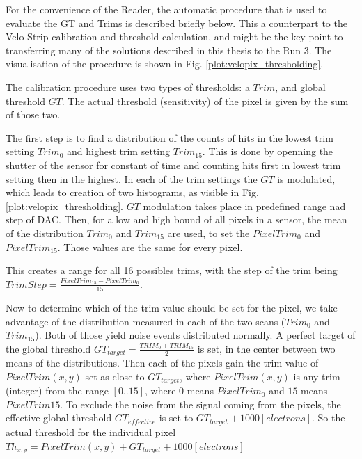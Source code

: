 For the convenience of the Reader, the automatic procedure that is used to evaluate the GT and Trims is described briefly below. This a counterpart to the Velo Strip calibration and threshold calculation, and might be the key point to transferring many of the solutions described in this thesis to the Run 3. The visualisation of the procedure is shown in Fig. \ref{plot:velopix_thresholding}.

The calibration procedure uses two types of thresholds: a $Trim$, and global threshold $GT$.
The actual threshold (sensitivity) of the pixel is given by the sum of those two.

The first step is to find a distribution of the counts of hits in the lowest trim setting  $Trim_{0}$ and highest trim setting $Trim_{15}$. This is done by openning the shutter of the sensor for constant of time and counting hits first in lowest trim setting then in the highest. In each of the trim settings the $GT$ is modulated, which leads to creation of two histograms, as visible in Fig. \ref{plot:velopix_thresholding}. $GT$ modulation takes place in predefined range nad step of DAC.
Then, for a low and high bound of all pixels in a sensor, the mean of the distribution $Trim_{0}$ and $Trim_{15}$ are used, to set the $PixelTrim_{0}$ and $PixelTrim_{15}$. Those values are the same for every pixel.

This creates a range for all 16 possibles trims, with the step of the trim being $TrimStep = \frac{PixelTrim_{15}-PixelTrim_{0}}{15}$.

Now to determine which of the trim value should be set for the pixel, we
take advantage of the distribution measured in each of the two scans ($Trim_{0}$ and $Trim_{15}$). Both of those yield noise events distributed normally.
A perfect target of the global threshold $GT_{target} = \frac{TRIM_{0}+TRIM_{15}}{2}$ is set, in the center between two means of the distributions.
Then each of the pixels gain the trim value of $PixelTrim(x,y)$ set as close to
$GT_{target}$, where $PixelTrim(x,y)$ is any trim (integer) from the range $[0..15]$, where $0$ means $PixelTrim_{0}$ and $15$ means $PixelTrim{15}$.
To exclude the noise from the signal coming from the pixels, the
effective global threshold $GT_{effective}$ is set to
$GT_{target} + 1000[electrons]$.
So the actual threshold for the individual pixel
$Th_{x,y} = {PixelTrim(x,y)} + GT_{target} + 1000[electrons]$

